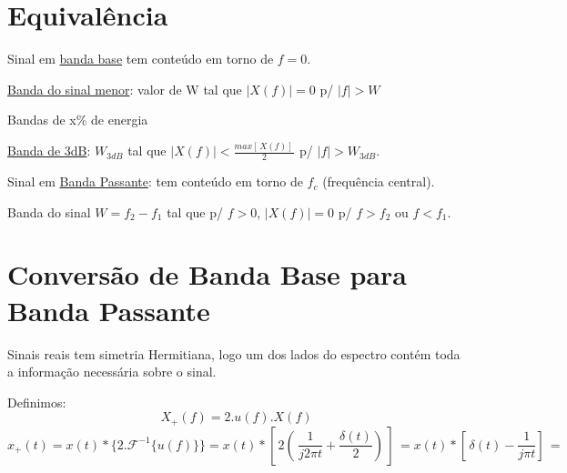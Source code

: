 \documentclass[12pt]{book}
\begin{document}
\section{Equivalência}

Sinal em \underline{banda base} tem conteúdo em torno de $f=0$.

\underline{Banda do sinal menor}: valor de W tal que \( |X(f)|=0\) p/ \(|f|>W \)

Bandas de x\% de energia

\underline{Banda de 3dB}: \( W_{3dB} \) tal que \( |X(f)|< \frac{max[\,X(f)]\,}{2} \)  p/ \( |f| > W_{3dB} \).

Sinal em \underline{Banda Passante}: tem conteúdo em torno de $f_c$ (frequência central).

Banda do sinal $W=f_2 - f_1$ tal que p/ $f>0$, $|X(f)|=0$ p/ $f>f_2$ ou $f<f_1$.

\section{Conversão de Banda Base para Banda Passante}

Sinais reais tem simetria Hermitiana, logo um dos lados do espectro contém toda a informação necessária sobre o sinal.

Definimos: 
\begin{equation}
X_+ (f)=2.u(f).X(f)
\end{equation}
\begin{equation}
x_+ (t) = x(t)*\{2.\mathcal{F}^{-1}\{u(f)\}\} = x(t)*[\, 2(\, \frac{1}{j2\pi t} + \frac{\delta (t)}{2} )\, ]\,
= x(t)*[\, \delta (t) - \frac{1}{j \pi t} ]\, = 
\end{equation}
\end{document}
